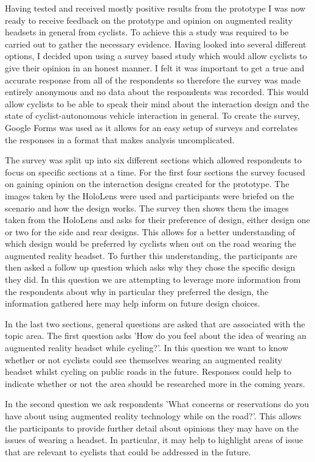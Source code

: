 \documentclass{l4proj}
\begin{document}
Having tested and received mostly positive results from the prototype I was now ready to receive feedback on the prototype and opinion on augmented reality headsets in general from cyclists. To achieve this a study was required to be carried out to gather the necessary evidence. Having looked into several different options, I decided upon using a survey based study which would allow cyclists to give their opinion in an honest manner. I felt it was important to get a true and accurate response from all of the respondents so therefore the survey was made entirely anonymous and no data about the respondents was recorded. This would allow cyclists to be able to speak their mind about the interaction design and the state of cyclist-autonomous vehicle interaction in general. To create the survey, Google Forms was used as it allows for an easy setup of surveys and correlates the responses in a format that makes analysis uncomplicated.

The survey was split up into six different sections which allowed respondents to focus on specific sections at a time. For the first four sections the survey focused on gaining opinion on the interaction designs created for the prototype. The images taken by the HoloLens were used and participants were briefed on the scenario and how the design works. The survey then shows them the images taken from the HoloLens and asks for their preference of design, either design one or two for the side and rear designs. This allows for a better understanding of which design would be preferred by cyclists when out on the road wearing the augmented reality headset. To further this understanding, the participants are then asked a follow up question which asks why they chose the specific design they did. In this question we are attempting to leverage more information from the respondents about why in particular they preferred the design, the information gathered here may help inform on future design choices.

In the last two sections, general questions are asked that are associated with the topic area. The first question asks 'How do you feel about the idea of wearing an augmented reality headset while cycling?'. In this question we want to know whether or not cyclists could see themselves wearing an augmented reality headset whilst cycling on public roads in the future. Responses could help to indicate whether or not the area should be researched more in the coming years.

In the second question we ask respondents 'What concerns or reservations do you have about using augmented reality technology while on the road?'. This allows the participants to provide further detail about opinions they may have on the issues of wearing a headset. In particular, it may help to highlight areas of issue that are relevant to cyclists that could be addressed in the future.
\end{document}
